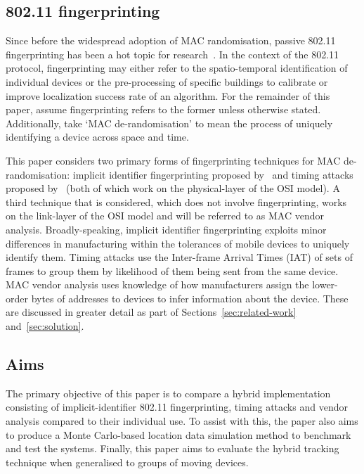 \subsection{802.11 fingerprinting}\label{sec:wifi-fingerprinting}

Since before the widespread adoption of MAC randomisation, passive 802.11 fingerprinting has been a hot topic for research~\cite{Pang2007}.
In the context of the 802.11 protocol, fingerprinting may either refer to the spatio-temporal identification of individual devices or the pre-processing of specific buildings to calibrate or improve localization success rate of an algorithm.
For the remainder of this paper, assume fingerprinting refers to the former unless otherwise stated.
Additionally, take `MAC de-randomisation' to mean the process of uniquely identifying a device across space and time.

This paper considers two primary forms of fingerprinting techniques for MAC de-randomisation: implicit identifier fingerprinting proposed by~ and timing attacks proposed by~ (both of which work on the physical-layer of the OSI model).
A third technique that is considered, which does not involve fingerprinting, works on the link-layer of the OSI model and will be referred to as MAC vendor analysis.
Broadly-speaking, implicit identifier fingerprinting exploits minor differences in manufacturing within the tolerances of mobile devices to uniquely identify them.
Timing attacks use the Inter-frame Arrival Times (IAT) of sets of frames to group them by likelihood of them being sent from the same device.
MAC vendor analysis uses knowledge of how manufacturers assign the lower-order bytes of addresses to devices to infer information about the device.
These are discussed in greater detail as part of Sections~\ref{sec:related-work} and~\ref{sec:solution}.

\subsection{Aims}\label{sec:aims}

The primary objective of this paper is to compare a hybrid implementation consisting of implicit-identifier 802.11 fingerprinting, timing attacks and vendor analysis compared to their individual use.
To assist with this, the paper also aims to produce a Monte Carlo-based location data simulation method to benchmark and test the systems.
Finally, this paper aims to evaluate the hybrid tracking technique when generalised to groups of moving devices.

